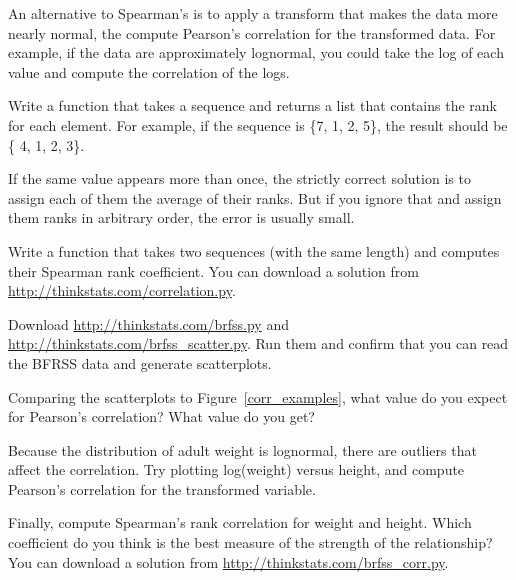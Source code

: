 \documentclass[12pt]{book}
\begin{document}
An alternative to Spearman's is to apply a transform that makes the
data more nearly normal, the compute Pearson's correlation for the
transformed data.  For example, if the data are approximately
lognormal, you could take the log of each value and compute the
correlation of the logs.

\begin{exercise}
Write a function that takes a sequence and returns a list that
contains the rank for each element.  For example, if the sequence is
\{7, 1, 2, 5\}, the result should be \{ 4, 1, 2, 3\}.

If the same value appears more than once, the strictly correct
solution is to assign each of them the average of their ranks.  But if
you ignore that and assign them ranks in arbitrary order, the error is
usually small.

Write a function that takes two sequences (with the same length) and
computes their Spearman rank coefficient.  You can download a solution
from \url{http://thinkstats.com/correlation.py}.

\end{exercise}


\begin{exercise}
Download \url{http://thinkstats.com/brfss.py} and
\url{http://thinkstats.com/brfss_scatter.py}.  Run them and confirm that you
can read the BFRSS data and generate scatterplots.

Comparing the scatterplots to Figure~\ref{corr_examples}, what value
do you expect for Pearson's correlation?  What value do you get?

Because the distribution of adult weight is lognormal, there are
outliers that affect the correlation.  Try plotting
log(weight) versus height, and compute Pearson's
correlation for the transformed variable.

Finally, compute Spearman's rank correlation for weight and height.
Which coefficient do you think is the best measure of the strength of
the relationship?  You can download a solution from
\url{http://thinkstats.com/brfss_corr.py}.

\end{exercise}
\end{document}
